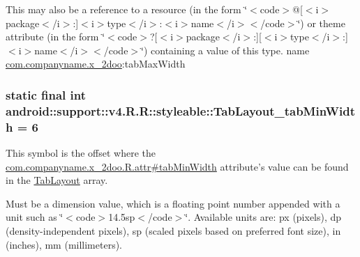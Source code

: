 This may also be a reference to a resource (in the form \char`\"{}$<$code$>$@\mbox{[}$<$i$>$package$<$/i$>$:\mbox{]}$<$i$>$type$<$/i$>$:$<$i$>$name$<$/i$>$$<$/code$>$\char`\"{}) or theme attribute (in the form \char`\"{}$<$code$>$?\mbox{[}$<$i$>$package$<$/i$>$:\mbox{]}\mbox{[}$<$i$>$type$<$/i$>$:\mbox{]}$<$i$>$name$<$/i$>$$<$/code$>$\char`\"{}) containing a value of this type.  name \hyperlink{namespacecom_1_1companyname_1_1x__2doo}{com.companyname.x\_\-2doo}:tabMaxWidth \hypertarget{classandroid_1_1support_1_1v4_1_1_r_1_1styleable_4b4566378cac3b5013ed493236349b6d}{
\subsubsection[{TabLayout\_\-tabMinWidth}]{\setlength{\rightskip}{0pt plus 5cm}static final int android::support::v4.R.R::styleable::TabLayout\_\-tabMinWidth = 6}}
\label{classandroid_1_1support_1_1v4_1_1_r_1_1styleable_4b4566378cac3b5013ed493236349b6d}


This symbol is the offset where the \hyperlink{classcom_1_1companyname_1_1x__2doo_1_1_r_1_1attr_684b24a1277fafd55a2a5daa6d2c2645}{com.companyname.x\_\-2doo.R.attr\#tabMinWidth} attribute's value can be found in the \hyperlink{classandroid_1_1support_1_1v4_1_1_r_1_1styleable_d1f1104cdc4fac0ab4797d48f7efe351}{TabLayout} array.

Must be a dimension value, which is a floating point number appended with a unit such as \char`\"{}$<$code$>$14.5sp$<$/code$>$\char`\"{}. Available units are: px (pixels), dp (density-independent pixels), sp (scaled pixels based on preferred font size), in (inches), mm (millimeters). 

